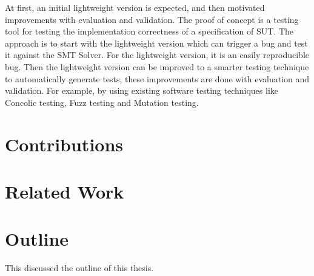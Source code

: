 At first, an initial lightweight version is expected, and then motivated
improvements with evaluation and validation. The proof of concept is a testing
tool for testing the implementation correctness of a specification of SUT. The
approach is to start with the lightweight version which can trigger a bug and
test it against the SMT Solver. For the lightweight version, it is an easily
reproducible bug. Then the lightweight version can be improved to a smarter
testing technique to automatically generate tests, these improvements are done
with evaluation and validation. For example, by using existing software testing
techniques like Concolic testing, Fuzz testing and Mutation testing.

\section{Contributions}

\section{Related Work}

\section{Outline}
This discussed the outline of this thesis.
